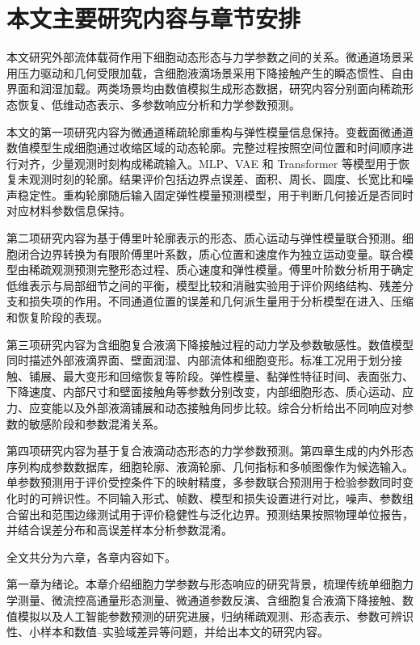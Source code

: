 \section{本文主要研究内容与章节安排}

本文研究外部流体载荷作用下细胞动态形态与力学参数之间的关系。微通道场景采用压力驱动和几何受限加载，含细胞液滴场景采用下降接触产生的瞬态惯性、自由界面和润湿加载。两类场景均由数值模拟生成形态数据，研究内容分别面向稀疏形态恢复、低维动态表示、多参数响应分析和力学参数预测。

本文的第一项研究内容为微通道稀疏轮廓重构与弹性模量信息保持。变截面微通道数值模型生成细胞通过收缩区域的动态轮廓。完整过程按照空间位置和时间顺序进行对齐，少量观测时刻构成稀疏输入。MLP、VAE 和 Transformer 等模型用于恢复未观测时刻的轮廓。结果评价包括边界点误差、面积、周长、圆度、长宽比和噪声稳定性。重构轮廓随后输入固定弹性模量预测模型，用于判断几何接近是否同时对应材料参数信息保持。

第二项研究内容为基于傅里叶轮廓表示的形态、质心运动与弹性模量联合预测。细胞闭合边界转换为有限阶傅里叶系数，质心位置和速度作为独立运动变量。联合模型由稀疏观测预测完整形态过程、质心速度和弹性模量。傅里叶阶数分析用于确定低维表示与局部细节之间的平衡，模型比较和消融实验用于评价网络结构、残差分支和损失项的作用。不同通道位置的误差和几何派生量用于分析模型在进入、压缩和恢复阶段的表现。

第三项研究内容为含细胞复合液滴下降接触过程的动力学及参数敏感性。数值模型同时描述外部液滴界面、壁面润湿、内部流体和细胞变形。标准工况用于划分接触、铺展、最大变形和回缩恢复等阶段。弹性模量、黏弹性特征时间、表面张力、下降速度、内部尺寸和壁面接触角等参数分别改变，内部细胞形态、质心运动、应力、应变能以及外部液滴铺展和动态接触角同步比较。综合分析给出不同响应对参数的敏感阶段和参数混淆关系。

第四项研究内容为基于复合液滴动态形态的力学参数预测。第四章生成的内外形态序列构成参数数据库，细胞轮廓、液滴轮廓、几何指标和多帧图像作为候选输入。单参数预测用于评价受控条件下的映射精度，多参数联合预测用于检验参数同时变化时的可辨识性。不同输入形式、帧数、模型和损失设置进行对比，噪声、参数组合留出和范围边缘测试用于评价稳健性与泛化边界。预测结果按照物理单位报告，并结合误差分布和高误差样本分析参数混淆。

全文共分为六章，各章内容如下。

第一章为绪论。本章介绍细胞力学参数与形态响应的研究背景，梳理传统单细胞力学测量、微流控高通量形态测量、微通道参数反演、含细胞复合液滴下降接触、数值模拟以及人工智能参数预测的研究进展，归纳稀疏观测、形态表示、参数可辨识性、小样本和数值--实验域差异等问题，并给出本文的研究内容。

